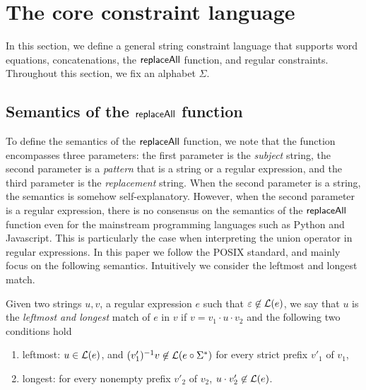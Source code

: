 
\section{The core constraint language}

In this section, we define a general string constraint language that supports word equations, concatenations, the $\mathsf{replaceAll}$ function, and regular constraints.  Throughout this section, we fix an alphabet $\Sigma$.



\subsection{Semantics of the $\mathsf{replaceAll}$ function}
To define the semantics of the $\mathsf{replaceAll}$ function, we note that the function encompasses three parameters: the first parameter is the \emph{subject} string, the second parameter is a \emph{pattern} that is a string or a regular expression, and the third parameter is the \emph{replacement} string.  
When the second parameter is a string, the semantics is somehow self-explanatory. However, when the second parameter is a regular expression, there is no consensus on the semantics of the $\mathsf{replaceAll}$ function even for the mainstream programming languages such as Python and Javascript.
 This is particularly the case when interpreting the union operator in regular expressions. In this paper we follow the POSIX standard, and mainly focus on the following semantics. Intuitively we consider the leftmost and longest match. 


\begin{definition}
Given two strings $u,v$, a regular expression $e$ such that $\varepsilon \not \in \mathcal{L}(e)$, we say that $u$ is the \emph{leftmost and longest} match of $e$ in $v$ if $v=v_1\cdot u \cdot v_2$ and the following two conditions hold
\begin{enumerate}
	\item leftmost: $u \in \mathcal{L}(e)$,  and $(v'_1)^{-1} v \not \in  \mathcal{L}(e \circ \Sigma^\ast)$ for every strict prefix $v'_1$ of $v_1$, 
	\item longest: for every nonempty prefix $v'_2$ of $v_2$, $u \cdot v'_2 \not \in \mathcal{L}(e)$.
\end{enumerate} 
\end{definition}


